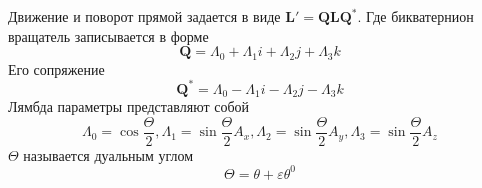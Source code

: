   Движение и поворот прямой задается в виде $\mathbf{L}' = \mathbf{QLQ^*}$. Где бикватернион вращатель записывается в форме
  \begin{equation*}
    \mathbf{Q} = \Lambda_0 + \Lambda_1 i + \Lambda_2 j + \Lambda_3 k
  \end{equation*}
  Его сопряжение 
  \begin{equation*}
    \mathbf{Q}^* = \Lambda_0 - \Lambda_1 i - \Lambda_2 j - \Lambda_3 k
  \end{equation*}
  Лямбда параметры представляют собой
  \begin{equation*}
    \Lambda_0 = \cos{\frac{\Theta}{2}}, \Lambda_1 = \sin{\frac{\Theta}{2}}A_x, \Lambda_2 = \sin{\frac{\Theta}{2}}A_y, \Lambda_3 = \sin{\frac{\Theta}{2}}A_z
  \end{equation*}
  $\Theta$ называется дуальным углом  
  \begin{equation*}
    \Theta  = \theta + \varepsilon \theta^0
  \end{equation*}







